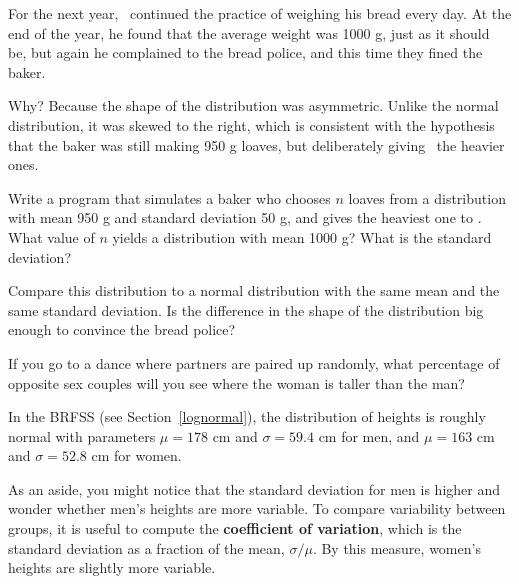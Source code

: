 \documentclass[12pt]{book}
\begin{document}

For the next year, \Poincare~continued the practice of weighing his
bread every day.  At the end of the year, he found that the average
weight was 1000 g, just as it should be, but again he complained to
the bread police, and this time they fined the baker.


Why?  Because the shape of the distribution was asymmetric.  Unlike
the normal distribution, it was skewed to the right, which is
consistent with the hypothesis that the baker was still making 950 g
loaves, but deliberately giving \Poincare~the heavier ones.


\begin{exercise}
Write a program that simulates a baker who chooses $n$ loaves from a
distribution with mean 950 g and standard deviation 50 g, and gives
the heaviest one to \Poincare.  What value of $n$ yields a
distribution with mean 1000 g?  What is the standard deviation?

Compare this distribution to a normal distribution with the same mean
and the same standard deviation.  Is the difference in the shape of
the distribution big enough to convince the bread police?

\end{exercise}


\begin{exercise}
\label{coef_var}
If you go to a dance where partners are paired up randomly, what
percentage of opposite sex couples will you see where the woman is
taller than the man?



In the BRFSS (see Section~\ref{lognormal}), the distribution of
heights is roughly normal with parameters $\mu=178$ cm and
$\sigma=59.4$ cm for men, and $\mu=163$ cm and $\sigma=52.8$ cm for
women.



As an aside, you might notice that the standard deviation for men is
higher and wonder whether men's heights are more variable.  To compare
variability between groups, it is useful to compute the {\bf
  coefficient of variation}, which is the standard deviation as a
fraction of the mean, $\sigma / \mu$.  By this measure, women's
heights are slightly more variable.



\end{exercise}
\end{document}
